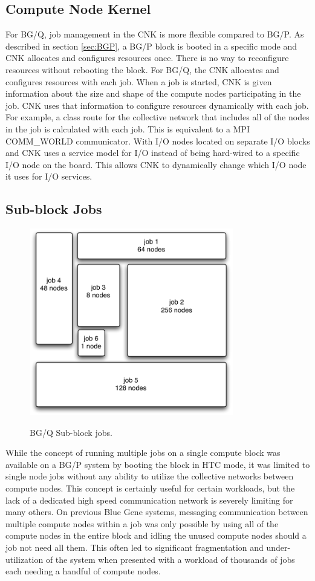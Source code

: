 \subsection{Compute Node Kernel}
\label{sec:cnk}
For BG/Q, job management in the CNK is more flexible compared to BG/P. As described in section \ref{sec:BGP}, 
a BG/P block is booted in a specific mode and CNK allocates and configures resources once.  There is no way to 
reconfigure resources without rebooting the block.  For BG/Q, the CNK allocates and configures resources with 
each job.  When a job is started, CNK is given information about the size and shape of the compute nodes 
participating in the job.  CNK uses that information to configure resources dynamically with each job.  
For example, a class route for the collective network that includes all of the nodes in the job is 
calculated with each job. This is equivalent to a MPI COMM\_WORLD communicator.  With I/O nodes located
on separate I/O blocks and CNK uses a service model for I/O instead of being hard-wired to a specific I/O node on 
the board.  This allows CNK to dynamically change which I/O node it uses for I/O services.

\subsection{Sub-block Jobs}
\label{sec:subblockjobs}

\begin{figure}[!b]
    \centering
    \caption{BG/Q Sub-block jobs.}
    \includegraphics[width=3.5in]{subblockjobs}
    \label{fig:subblockjobs}
\end{figure}

While the concept of running multiple jobs on a single compute block was available on a BG/P system by
booting the block in HTC mode, it was limited to single node jobs without any ability to utilize the collective
networks between compute nodes. This concept is certainly useful for certain workloads, but the lack of a 
dedicated high speed communication network is severely limiting for many others. On previous Blue Gene systems,
messaging communication between multiple compute nodes within a job was only possible by using all of the compute nodes
in the entire block and idling the unused compute nodes should a job not need all them. This often led to 
significant fragmentation and under-utilization of the system when presented with a workload of thousands of 
jobs each needing a handful of compute nodes.

